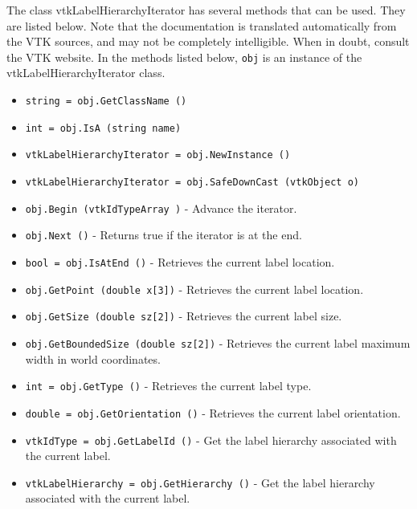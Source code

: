 The class vtkLabelHierarchyIterator has several methods that can be used.
  They are listed below.
Note that the documentation is translated automatically from the VTK sources,
and may not be completely intelligible.  When in doubt, consult the VTK website.
In the methods listed below, \verb|obj| is an instance of the vtkLabelHierarchyIterator class.
\begin{itemize}
\item  \verb|string = obj.GetClassName ()|

\item  \verb|int = obj.IsA (string name)|

\item  \verb|vtkLabelHierarchyIterator = obj.NewInstance ()|

\item  \verb|vtkLabelHierarchyIterator = obj.SafeDownCast (vtkObject o)|

\item  \verb|obj.Begin (vtkIdTypeArray )| -  Advance the iterator.

\item  \verb|obj.Next ()| -  Returns true if the iterator is at the end.

\item  \verb|bool = obj.IsAtEnd ()| -  Retrieves the current label location.

\item  \verb|obj.GetPoint (double x[3])| -  Retrieves the current label location.

\item  \verb|obj.GetSize (double sz[2])| -  Retrieves the current label size.

\item  \verb|obj.GetBoundedSize (double sz[2])| -  Retrieves the current label maximum width in world coordinates.

\item  \verb|int = obj.GetType ()| -  Retrieves the current label type.

\item  \verb|double = obj.GetOrientation ()| -  Retrieves the current label orientation.

\item  \verb|vtkIdType = obj.GetLabelId ()| -  Get the label hierarchy associated with the current label.

\item  \verb|vtkLabelHierarchy = obj.GetHierarchy ()| -  Get the label hierarchy associated with the current label.


\end{itemize}
